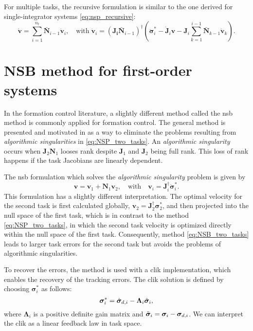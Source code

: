 For multiple tasks, the recursive formulation is similar to the one derived for single-integrator systems \eqref{eq:nsp_recursive}:
\begin{equation}
     \dot{\mathbf{v}} = \sum_{i=1}^{n_t} \bar{\mathbf{N}}_{i-1} \dot{\mathbf{v}}_i, \quad \mathrm{with} \; \dot{\mathbf{v}}_i = \left(\mathbf{J_i} \bar{\mathbf{N}}_{i-1}\right)^\dagger\left(\ddot{\bm{\sigma}}_i^* - \dot{\mathbf{J}}_i \mathbf{v} - \mathbf{J}_i \sum_{k=1}^{i-1} \bar{\mathbf{N}}_{k-1} \dot{\mathbf{v}}_k\right).
\end{equation}


\section{NSB method for first-order systems}\label{sec:NSB_first_order}
In the formation control literature, a slightly different method called the \gls{nsb} method is commonly applied for formation control. The general method is presented and motivated in \cite{chiaverini_singularity-robust_1997} as a way to eliminate the problems resulting from \textit{algorithmic singularities} in \eqref{eq:NSP_two_tasks}. An \textit{algorithmic singularity} occurs when $\mathbf{J}_2 \mathbf{N}_1$ looses rank despite $\mathbf{J}_1$ and $\mathbf{J}_2$ being full rank. This loss of rank happens if the task Jacobians are linearly dependent.

The \gls{nsb} formulation which solves the \textit{algorithmic singularity} problem is given by
\begin{equation}\label{eq:NSB_two_tasks}
    \mathbf{v} = \mathbf{v}_1 + \mathbf{N}_1\mathbf{v}_2, \quad \mathrm{with} \quad \mathbf{v}_i = \mathbf{J}_i^\dagger \dot{\bm{\sigma}}_i^*.
\end{equation}
This formulation has a slightly different interpretation. The optimal velocity for the second task is first calculated globally, $\mathbf{v}_2 = \mathbf{J}_2^\dagger \bm{\sigma}_2^*$, and then projected into the null space of the first task, which is in contrast to the method \eqref{eq:NSP_two_tasks}, in which the second task velocity is optimized directly within the null space of the first task. Consequently, method \eqref{eq:NSB_two_tasks} leads to larger task errors for the second task but avoids the problems of algorithmic singularities.

To recover the errors, the method is used with a \gls{clik} implementation, which enables the recovery of the tracking errors. The \gls{clik} solution is defined by choosing $\bm{\sigma}_i^*$ as follows:
\begin{equation}
    \bm{\sigma}_i^* = \dot{\bm{\sigma}}_{d,i} - \bm{\Lambda}_i \Tilde{\bm{\sigma}}_i,
\end{equation}
where $\bm{\Lambda}_i$ is a positive definite gain matrix and $\Tilde{\bm{\sigma}}_i = \bm{\sigma}_i - \bm{\sigma}_{d,i}$. We can interpret the \gls{clik} as a linear feedback law in task space.

